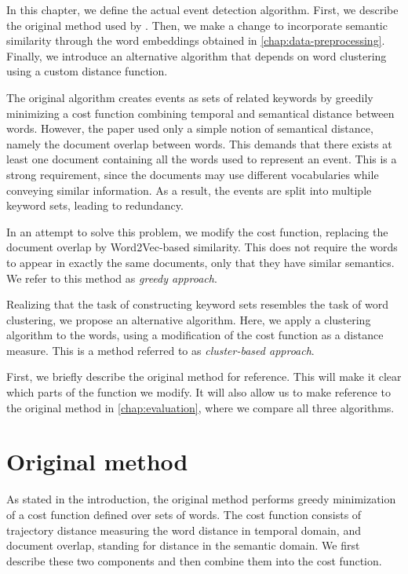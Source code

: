 In this chapter, we define the actual event detection algorithm. First, we describe the original method used by \cite{event-detection}. Then, we make a change to incorporate semantic similarity through the word embeddings obtained in \autoref{chap:data-preprocessing}. Finally, we introduce an alternative algorithm that depends on word clustering using a custom distance function.

The original algorithm creates events as sets of related keywords by greedily minimizing a cost function combining temporal and semantical distance between words. However, the paper used only a simple notion of semantical distance, namely the document overlap between words. This demands that there exists at least one document containing all the words used to represent an event. This is a strong requirement, since the documents may use different vocabularies while conveying similar information.  As a result, the events are split into multiple keyword sets, leading to redundancy.

In an attempt to solve this problem, we modify the cost function, replacing the document overlap by Word2Vec-based similarity. This does not require the words to appear in exactly the same documents, only that they have similar semantics. We refer to this method as \textit{greedy approach}.

Realizing that the task of constructing keyword sets resembles the task of word clustering, we propose an alternative algorithm. Here, we apply a clustering algorithm to the words, using a modification of the cost function as a distance measure. This is a method referred to as \textit{cluster-based approach}.

First, we briefly describe the original method for reference. This will make it clear which parts of the function we modify. It will also allow us to make reference to the original method in \autoref{chap:evaluation}, where we compare all three algorithms.

\section{Original method}
As stated in the introduction, the original method performs greedy minimization of a cost function defined over sets of words. The cost function consists of trajectory distance measuring the word distance in temporal domain, and document overlap, standing for distance in the semantic domain. We first describe these two components and then combine them into the cost function.

